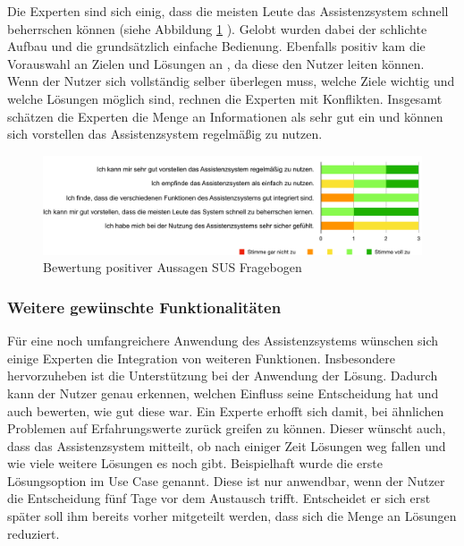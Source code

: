 Die Experten sind sich einig, dass die meisten Leute das Assistenzsystem schnell beherrschen können (siehe Abbildung \ref{pic:SUS-positiv} ). Gelobt wurden dabei der schlichte Aufbau und die grundsätzlich einfache Bedienung. Ebenfalls positiv kam die Vorauswahl an Zielen und Lösungen an , da diese den Nutzer leiten können. Wenn der Nutzer sich vollständig selber überlegen muss, welche Ziele wichtig und welche Lösungen möglich sind, rechnen die Experten mit Konflikten. Insgesamt schätzen die Experten die Menge an Informationen als sehr gut ein und können sich vorstellen das Assistenzsystem regelmäßig zu nutzen.
\begin{figure}[htb]
\centering
\includegraphics[scale=0.55]{DA_files/Bilder/Validierung/Bild-positive_Aussagen.pdf}
\caption{Bewertung positiver Aussagen SUS Fragebogen}
\label{pic:SUS-positiv}
\end{figure}

\subsubsection*{Weitere gewünschte Funktionalitäten}
Für eine noch umfangreichere Anwendung des Assistenzsystems wünschen sich einige Experten die Integration von weiteren Funktionen. Insbesondere hervorzuheben ist die Unterstützung bei der Anwendung der Lösung. Dadurch kann der Nutzer genau erkennen, welchen Einfluss seine Entscheidung hat und auch bewerten, wie gut diese war. Ein Experte erhofft sich damit, bei ähnlichen Problemen auf Erfahrungswerte zurück greifen zu können. Dieser wünscht auch, dass das Assistenzsystem mitteilt, ob nach einiger Zeit Lösungen weg fallen und wie viele weitere Lösungen es noch gibt. Beispielhaft wurde die erste Lösungsoption im Use Case genannt. Diese ist nur anwendbar, wenn der Nutzer die Entscheidung fünf Tage vor dem Austausch trifft. Entscheidet er sich erst später soll ihm bereits vorher mitgeteilt werden, dass sich die Menge an Lösungen reduziert. 

